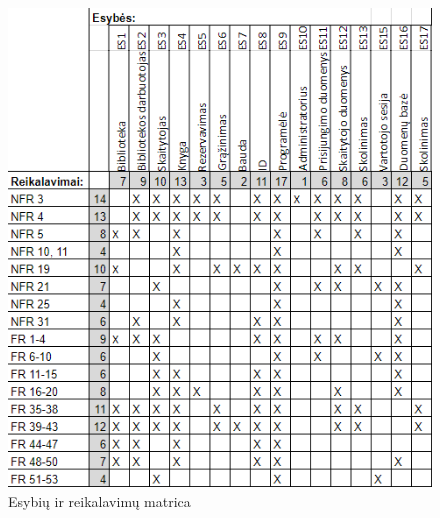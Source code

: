\documentclass{VUMIFPSkursinis}
\begin{document}
\begin{figure}[H]
    \centering
    \includegraphics[width=1.05\textwidth]{matricos/matrreikesybes.png}
    \caption{Esybių ir reikalavimų matrica}    
\end{figure}
\end{document}
